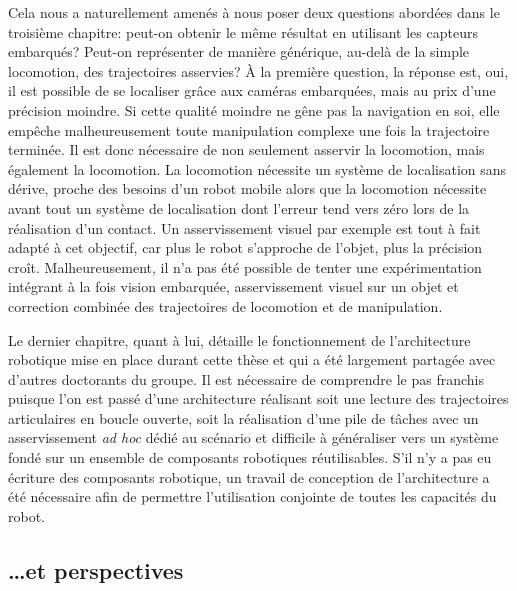 Cela nous a naturellement amenés à nous poser deux questions abordées
dans le troisième chapitre: peut-on obtenir le même résultat en
utilisant les capteurs embarqués? Peut-on représenter de manière
générique, au-delà de la simple locomotion, des trajectoires
asservies? À la première question, la réponse est, oui, il est
possible de se localiser grâce aux caméras embarquées, mais au prix
d'une précision moindre. Si cette qualité moindre ne gêne pas la
navigation en soi, elle empêche malheureusement toute manipulation
complexe une fois la trajectoire terminée. Il est donc nécessaire de
non seulement asservir la locomotion, mais également la locomotion. La
locomotion nécessite un système de localisation sans dérive, proche
des besoins d'un robot mobile alors que la locomotion nécessite avant
tout un système de localisation dont l'erreur tend vers zéro lors de
la réalisation d'un contact. Un asservissement visuel par exemple est
tout à fait adapté à cet objectif, car plus le robot s'approche de
l'objet, plus la précision croît. Malheureusement, il n'a pas été
possible de tenter une expérimentation intégrant à la fois vision
embarquée, asservissement visuel sur un objet et correction combinée
des trajectoires de locomotion et de manipulation.


Le dernier chapitre, quant à lui, détaille le fonctionnement de
l'architecture robotique mise en place durant cette thèse et qui a été
largement partagée avec d'autres doctorants du groupe. Il est
nécessaire de comprendre le pas franchis puisque l'on est passé d'une
architecture réalisant soit une lecture des trajectoires articulaires
en boucle ouverte, soit la réalisation d'une pile de tâches avec un
asservissement \emph{ad hoc} dédié au scénario et difficile à
généraliser vers un système fondé sur un ensemble de composants
robotiques réutilisables. S'il n'y a pas eu écriture des composants
robotique, un travail de conception de l'architecture a été nécessaire
afin de permettre l'utilisation conjointe de toutes les capacités du
robot.



\subsection{\ldots et perspectives}


